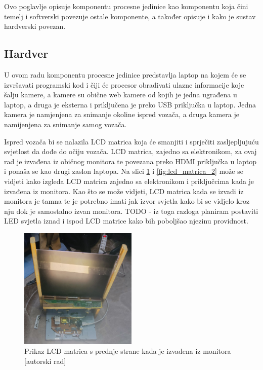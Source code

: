 \documentclass{foi}
\begin{document}
Ovo poglavlje opisuje komponentu procesne jedinice kao komponentu koja čini temelj i softverski povezuje ostale komponente, a također opisuje i kako je sustav hardverski povezan.

\subsection{Hardver}
U ovom radu komponentu procesne jedinice predstavlja laptop na kojem će se izvršavati programski kod i čiji će procesor obrađivati ulazne informacije koje šalju kamere, a kamere su obične web kamere od kojih je jedna ugrađena u laptop, a druga je eksterna i priključena je preko USB priključka u laptop. Jedna kamera je namjenjena za snimanje okoline ispred vozača, a druga kamera je namijenjena za snimanje samog vozača.

Ispred vozača bi se nalazila LCD matrica koja će smanjiti i sprječiti zasljepljujuću svjetlost da dođe do očiju vozača. LCD matrica, zajedno sa elektronikom, za ovaj rad je izvađena iz običnog monitora te povezana preko HDMI priključka u laptop i ponaša se kao drugi zaslon laptopa. Na slici \ref{fig:lcd_matrica_1} i \ref{fig:lcd_matrica_2} može se vidjeti kako izgleda LCD matrica zajedno sa elektronikom i priključcima kada je izvađena iz monitora. Kao što se može vidjeti, LCD matrica kada se izvadi iz monitora je tamna te je potrebno imati jak izvor svjetla kako bi se vidjelo kroz nju dok je samostalno izvan monitora. TODO - iz toga razloga planiram postaviti LED svjetla iznad i ispod LCD matrice kako bih poboljšao njezinu providnost.

\begin{figure}[h!]
    \centering
    \includegraphics[width=0.5\textwidth]{slike/lcd_matrica_1}
    \caption{Prikaz LCD matrica s prednje strane kada je izvađena iz monitora [autorski rad]}
    \label{fig:lcd_matrica_1}
\end{figure}
\end{document}
